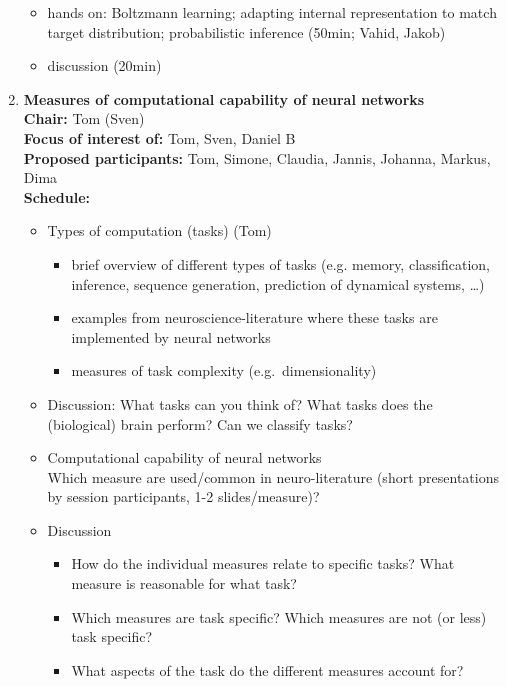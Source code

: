 \documentclass[10pt, a4paper,twoside,american]{article}
\begin{document}
\begin{enumerate}[resume]
\begin{itemize}
  \item hands on: Boltzmann learning; adapting internal representation to match target distribution; probabilistic inference (50min; Vahid, Jakob)
  \item discussion (20min)
  \end{itemize}
\item {\large\bf Measures of computational capability of neural networks}\\[1ex]
  {\bf Chair:} Tom (Sven)\\[1ex]
  {\bf Focus of interest of:} Tom, Sven, Daniel B\\[1ex]
  {\bf Proposed participants:} Tom, Simone, Claudia, Jannis, Johanna, Markus, Dima\\[1ex]
  {\bf Schedule:}
  \begin{itemize}
  \item Types of computation (tasks) (Tom)
    \begin{itemize}
    \item brief overview of different types of tasks
      (e.g. memory, classification, inference, sequence generation, prediction of dynamical systems, \ldots)
    \item examples from neuroscience-literature where these tasks are implemented by neural networks
    \item measures of task complexity (e.g.~dimensionality)
    \end{itemize}
  \item Discussion:
    What tasks can you think of? What tasks does the (biological) brain perform?
    Can we classify tasks?
  \item Computational capability of neural networks\\[1ex]
    Which measure are used/common in neuro-literature (short presentations by session participants, 1-2 slides/measure)?
  \item Discussion
    \begin{itemize}
    \item How do the individual measures relate to specific tasks? What measure is reasonable for what task?
    \item Which measures are task specific? Which measures are not (or less) task specific?
    \item What aspects of the task do the different measures account for? 
    \end{itemize}
  \end{itemize}

\end{enumerate}
\end{document}
